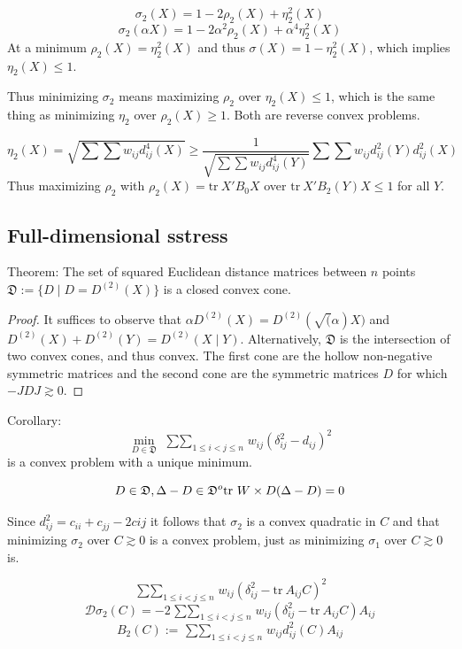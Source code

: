 \documentclass[
  12pt,
]{book}
\theoremstyle{definition}
\theoremstyle{definition}
\theoremstyle{definition}
\theoremstyle{definition}
\theoremstyle{remark}
\begin{document}
\[\sigma_2(X)=1-2\rho_2(X)+\eta_2^2(X)\]
\[\sigma_2(\alpha X)=1-2\alpha^2\rho_2(X)+\alpha^4\eta_2^2(X)\]
At a minimum \(\rho_2(X)=\eta_2^2(X)\) and thus \(\sigma(X)=1-\eta_2^2(X)\), which
implies \(\eta_2(X)\leq 1\).

Thus minimizing \(\sigma_2\) means maximizing \(\rho_2\) over \(\eta_2(X)\leq 1\),
which is the same thing as minimizing \(\eta_2\) over \(\rho_2(X)\geq 1\). Both are reverse convex problems.

\[
\eta_2(X)=\sqrt{\sum\sum w_{ij}d_{ij}^4(X)}\geq\frac{1}{\sqrt{\sum\sum w_{ij}d_{ij}^4(Y)}}\sum\sum w_{ij}d_{ij}^2(Y)d_{ij}^2(X)
\]
Thus maximizing \(\rho_2\) with \(\rho_2(X)=\text{tr}\ X'B_0X\) over \(\text{tr}\ X'B_2(Y)X\leq 1\) for all \(Y\).

\hypertarget{full-dimensional-sstress}{%
\subsection{Full-dimensional sstress}\label{full-dimensional-sstress}}

Theorem: The set of squared Euclidean distance matrices between \(n\) points \(\mathfrak{D}:=\{D\mid D=D^{(2)}(X)\}\) is a closed convex cone.

\begin{proof}
It suffices to observe that \(\alpha D^{(2)}(X)=D^{(2)}(\sqrt(\alpha)X)\) and \(D^{(2)}(X)+D^{(2)}(Y)=D^{(2)}(X\mid Y)\).
Alternatively, \(\mathfrak{D}\) is the intersection of two convex cones, and thus convex. The first cone are the hollow non-negative symmetric matrices and the second cone are the symmetric matrices \(D\) for which \(-JDJ\gtrsim 0\).
\end{proof}

Corollary: \[\min_{D\in\mathfrak{D}}\ \mathop{\sum\sum}_{1\leq i<j\leq n}w_{ij}(\delta_{ij}^2-d_{ij})^2\] is a convex problem with a unique minimum.

\[
D\in\mathfrak{D},\\
\Delta-D\in\mathfrak{D}^o\\
\text{tr}\ W\times D(\Delta-D)=0
\]

Since \(d_{ij}^2=c_{ii}+c_{jj}-2c{ij}\) it follows that \(\sigma_2\) is a convex quadratic
in \(C\) and that minimizing \(\sigma_2\) over \(C\gtrsim 0\) is a convex problem, just as minimizing \(\sigma_1\) over \(C\gtrsim 0\) is.

\[
\mathop{\sum\sum}_{1\leq i<j\leq n}w_{ij}(\delta_{ij}^2-\text{tr}\ A_{ij}C)^2
\]
\[
\mathcal{D}\sigma_2(C)=-2\mathop{\sum\sum}_{1\leq i<j\leq n}w_{ij}(\delta_{ij}^2-\text{tr}\ A_{ij}C)A_{ij}
\]
\[
B_2(C):=\mathop{\sum\sum}_{1\leq i<j\leq n}w_{ij}d_{ij}^2(C)A_{ij}
\]
\end{document}
